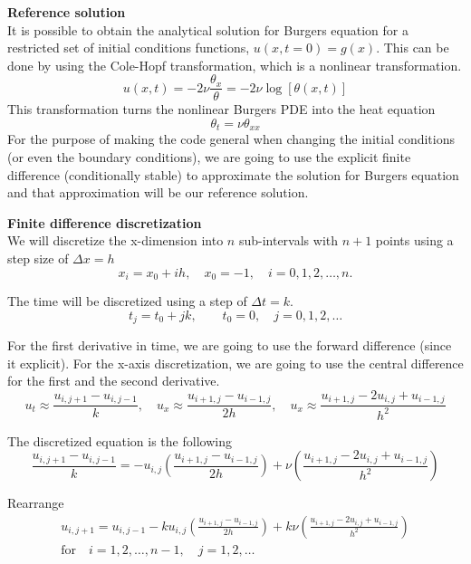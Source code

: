 \documentclass[a4paper,12pt]{article}
\theoremstyle{definition}
\begin{document}
\textbf{Reference solution}\\
It is possible to obtain the analytical solution for Burgers equation for a 
restricted set of initial conditions functions, $u(x,t=0) = g(x)$. This can be done by 
using the Cole-Hopf transformation, which is a nonlinear transformation\cite{kutluay1999numerical}.
\begin{equation}
u(x, t) = -2 \nu \frac{\theta_x}{\theta} = -2 \nu \log[\theta(x,t)]
\end{equation}
This transformation turns the nonlinear Burgers PDE into the heat equation
\begin{equation}
\theta_t = \nu \theta_{xx}
\end{equation}
For the purpose of making the code general when changing the initial conditions (or even the boundary conditions), 
we are going to use the explicit finite difference (conditionally stable) to approximate the solution for 
Burgers equation and that approximation will be our reference solution.

\textbf{Finite difference discretization}\\
We will discretize the x-dimension into $n$ sub-intervals with $n+1$ points using a step size of $\Delta x = h$
$$
x_i = x_0 + ih, \quad x_0 = -1, \quad i = 0, 1, 2, \dots, n.
$$  

The time will be discretized using a step of $\Delta t = k$.
$$
t_j = t_0 + jk, \qquad t_0 = 0, \quad j = 0, 1, 2, \dots
$$

For the first derivative in time, we are going to use the forward difference (since it explicit). 
For the x-axis discretization, we are going to use the central difference for the first and the second derivative.
$$
u_t \approx \frac{u_{i,j+1} - u_{i, j-1}}{k}, \quad
u_x \approx \frac{ u_{i+1,j} - u_{i-1,j} }{2h}, \quad
u_x \approx \frac{ u_{i+1,j} - 2 u_{i,j} + u_{i-1,j} }{h^2}
$$

The discretized equation is the following
\begin{equation}
\frac{u_{i,j+1} - u_{i, j-1}}{k} =
- u_{i,j} \left( \frac{ u_{i+1,j} - u_{i-1,j} }{2h} \right)
+ \nu \left( \frac{ u_{i+1,j} - 2 u_{i,j} + u_{i-1,j} }{h^2} \right)
\end{equation}

Rearrange
\begin{multline}
u_{i,j+1}  = u_{i, j-1}
- k u_{i,j} \left( \frac{ u_{i+1,j} - u_{i-1,j} }{2h} \right)
+ k \nu \left( \frac{ u_{i+1,j} - 2 u_{i,j} + u_{i-1,j} }{h^2} \right)
\\ \text{for} \quad i=1, 2, \dots, n-1,  \quad j = 1, 2, \dots
\end{multline}
\end{document}
